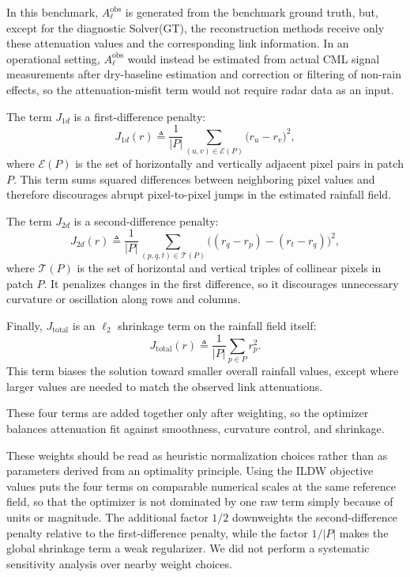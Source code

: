 \documentclass[11pt]{article}
\begin{document}
{\color{black}In this benchmark, $A_\ell^{\mathrm{obs}}$ is generated from the benchmark ground truth, but, except for the diagnostic Solver(GT), the reconstruction methods receive only these attenuation values and the corresponding link information. In an operational setting, $A_\ell^{\mathrm{obs}}$ would instead be estimated from actual CML signal measurements after dry-baseline estimation and correction or filtering of non-rain effects, so the attenuation-misfit term would not require radar data as an input.}

The term $J_{1d}$ is a first-difference penalty:
\[
J_{1d}(r)\triangleq\frac{1}{|P|}\sum_{(u,v)\in\mathcal{E}(P)}\bigl(r_u-r_v\bigr)^2,
\]
where $\mathcal{E}(P)$ is the set of horizontally and vertically adjacent pixel pairs in patch $P$. This term sums squared differences between neighboring pixel values and therefore discourages abrupt pixel-to-pixel jumps in the estimated rainfall field.

The term $J_{2d}$ is a second-difference penalty:
\[
J_{2d}(r)\triangleq\frac{1}{|P|}\sum_{(p,q,t)\in\mathcal{T}(P)}
\bigl((r_q-r_p)-(r_t-r_q)\bigr)^2,
\]
where $\mathcal{T}(P)$ is the set of horizontal and vertical triples of collinear pixels in patch $P$. It penalizes changes in the first difference, so it discourages unnecessary curvature or oscillation along rows and columns.

Finally, $J_{\mathrm{total}}$ is an $\ell_2$ shrinkage term on the rainfall field itself:
\[
J_{\mathrm{total}}(r)\triangleq\frac{1}{|P|}\sum_{p\in P}r_p^2.
\]
This term biases the solution toward smaller overall rainfall values, except where larger values are needed to match the observed link attenuations.

These four terms are added together only after weighting, so the optimizer balances attenuation fit against smoothness, curvature control, and shrinkage.

These weights should be read as heuristic normalization choices rather than as parameters derived from an optimality principle. Using the ILDW objective values puts the four terms on comparable numerical scales at the same reference field, so that the optimizer is not dominated by one raw term simply because of units or magnitude. The additional factor $1/2$ downweights the second-difference penalty relative to the first-difference penalty, while the factor $1/|P|$ makes the global shrinkage term a weak regularizer. We did not perform a systematic sensitivity analysis over nearby weight choices.
\end{document}
